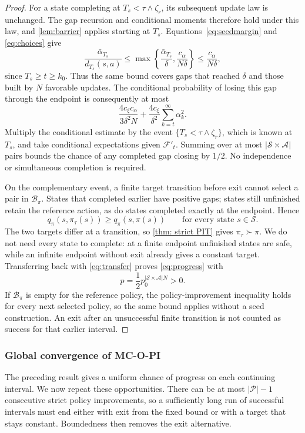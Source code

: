 \begin{proof}
For a state completing at $T_s<\tau\wedge\zeta_r$, its subsequent update law is unchanged. The gap recursion and conditional moments therefore hold under this law, and \autoref{lem:barrier} applies starting at $T_s$. Equations~\eqref{eq:seedmargin} and \eqref{eq:choices} give
\[
\frac{\bar\alpha_{T_s}}{d_{T_s}(s,a)}
\le\max\left\{\frac{\bar\alpha_{T_s}}{\delta},\frac{c_\alpha}{N\delta}\right\}
\le\frac{c_\alpha}{N\delta},
\]
since $T_s\ge t\ge k_0$. Thus the same bound covers gaps that reached $\delta$ and those built by $N$ favorable updates. The conditional probability of losing this gap through the endpoint is consequently at most
\begin{equation}
\label{eq:crossprob}
\frac{4c_\xi c_\alpha}{3\delta^2N}
+\frac{4c_\xi}{\delta^2}\sum_{k=t}^\infty\alpha_k^2.
\end{equation}
Multiply the conditional estimate by the event $\{T_s<\tau\wedge\zeta_r\}$, which is known at $T_s$, and take conditional expectations given $\mathcal F'_t$. Summing over at most $|\mathcal S\times\mathcal A|$ pairs bounds the chance of any completed gap closing by $1/2$. No independence or simultaneous completion is required.

On the complementary event, a finite target transition before exit cannot select a pair in $\mathcal B_\pi$. States that completed earlier have positive gaps; states still unfinished retain the reference action, as do states completed exactly at the endpoint. Hence
\[
q_\pi(s,\pi_\tau(s))\ge q_\pi(s,\pi(s))
\qquad\text{for every state }s\in\mathcal S.
\]
The two targets differ at a transition, so \autoref{thm: strict PIT} gives $\pi_\tau\succ\pi$.
We do not need every state to complete: at a finite endpoint unfinished states are safe, while an infinite endpoint without exit already gives a constant target. Transferring back with \eqref{eq:transfer} proves \eqref{eq:progress} with
\[
p=\frac12p_0^{|\mathcal S\times\mathcal A|N}>0.
\]
If $\mathcal B_\pi$ is empty for the reference policy, the policy-improvement inequality holds for every next selected policy, so the same bound applies without a seed construction. An exit after an unsuccessful finite transition is not counted as success for that earlier interval.
\end{proof}

\subsubsection{Global convergence of MC-O-PI}
The preceding result gives a uniform chance of progress on each continuing interval. We now repeat these opportunities. There can be at most $|\mathcal P|-1$ consecutive strict policy improvements, so a sufficiently long run of successful intervals must end either with exit from the fixed bound or with a target that stays constant. Boundedness then removes the exit alternative.

